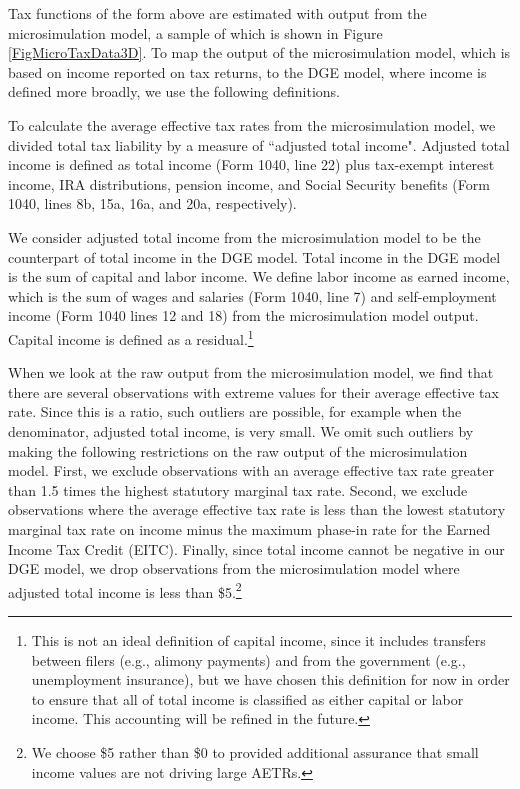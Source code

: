 \documentclass[letterpaper,12pt]{article}
\theoremstyle{definition}
\begin{document}
\begin{spacing}{1.5}
    Tax functions of the form above are estimated with output from the microsimulation model, a sample of which is shown in Figure \ref{FigMicroTaxData3D}. To map the output of the microsimulation model, which is based on income reported on tax returns, to the DGE model, where income is defined more broadly, we use the following definitions.

    To calculate the average effective tax rates from the microsimulation model, we divided total tax liability by a measure of ``adjusted total income".  Adjusted total income is defined as total income (Form 1040, line 22) plus tax-exempt interest income, IRA distributions, pension income, and Social Security benefits (Form 1040, lines 8b, 15a, 16a, and 20a, respectively).

    We consider adjusted total income from the microsimulation model to be the counterpart of total income in the DGE model. Total income in the DGE model is the sum of capital and labor income. We define labor income as earned income, which is the sum of wages and salaries (Form 1040, line 7) and self-employment income (Form 1040 lines 12 and 18) from the microsimulation model output. Capital income is defined as a residual.\footnote{This is not an ideal definition of capital income, since it includes transfers between filers (e.g., alimony payments) and from the government (e.g., unemployment insurance), but we have chosen this definition for now in order to ensure that all of total income is classified as either capital or labor income. This accounting will be refined in the future.}

    When we look at the raw output from the microsimulation model, we find that there are several observations with extreme values for their average effective tax rate. Since this is a ratio, such outliers are possible, for example when the denominator, adjusted total income, is very small. We omit such outliers by making the following restrictions on the raw output of the microsimulation model. First, we exclude observations with an average effective tax rate greater than 1.5 times the highest statutory marginal tax rate.  Second, we exclude observations where the average effective tax rate is less than the lowest statutory marginal tax rate on income minus the maximum phase-in rate for the Earned Income Tax Credit (EITC).  Finally, since total income cannot be negative in our DGE model, we drop observations from the microsimulation model where adjusted total income is less than \$5.\footnote{We choose \$5 rather than \$0 to provided additional assurance that small income values are not driving large AETRs.}


\end{spacing}
\end{document}
